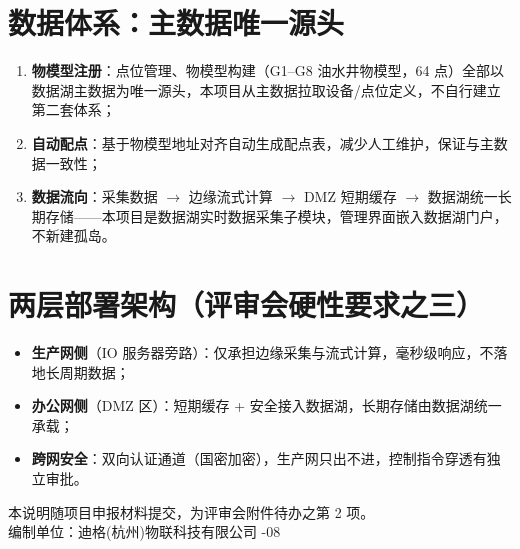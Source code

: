 \documentclass[11pt,a4paper]{ctexart}
\begin{document}
\section{数据体系：主数据唯一源头}

\begin{enumerate}[leftmargin=*]
  \item \textbf{物模型注册}：点位管理、物模型构建（G1--G8 油水井物模型，64 点）全部以数据湖主数据为唯一源头，本项目从主数据拉取设备/点位定义，不自行建立第二套体系；
  \item \textbf{自动配点}：基于物模型地址对齐自动生成配点表，减少人工维护，保证与主数据一致性；
  \item \textbf{数据流向}：采集数据 $\rightarrow$ 边缘流式计算 $\rightarrow$ DMZ 短期缓存 $\rightarrow$ 数据湖统一长期存储——本项目是数据湖实时数据采集子模块，管理界面嵌入数据湖门户，不新建孤岛。
\end{enumerate}

\section{两层部署架构（评审会硬性要求之三）}

\begin{itemize}[leftmargin=*]
  \item \textbf{生产网侧}（IO 服务器旁路）：仅承担边缘采集与流式计算，毫秒级响应，不落地长周期数据；
  \item \textbf{办公网侧}（DMZ 区）：短期缓存 + 安全接入数据湖，长期存储由数据湖统一承载；
  \item \textbf{跨网安全}：双向认证通道（国密加密），生产网只出不进，控制指令穿透有独立审批。
\end{itemize}

\vspace{1em}
\noindent\hrulefill

\begin{center}
\small 本说明随项目申报材料提交，为评审会附件待办之第 2 项。\\
编制单位：迪格(杭州)物联科技有限公司 -08
\end{center}
\end{document}
